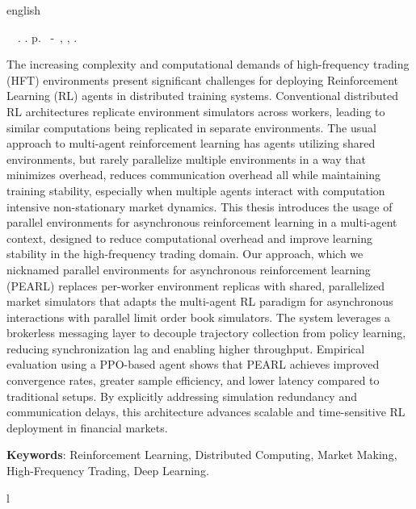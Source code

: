 \begin{resumo}[Abstract]
 \begin{otherlanguage*}{english}
	\begin{flushleft} 
		\setlength{\absparsep}{0pt} %
 		\SingleSpacing  		\imprimirautorabr~~\textbf{\imprimirtitleabstract}.	\imprimirdata.  \pageref{LastPage} p. 
		\imprimirtipotrabalhoabs~-~\imprimirinstituicao, \imprimirlocal, 	\imprimirdata. 
 	\end{flushleft}
	\OnehalfSpacing
    The increasing complexity and computational demands of high-frequency trading (HFT) environments present significant challenges for
    deploying Reinforcement Learning (RL) agents in distributed training systems.
    Conventional distributed RL architectures replicate environment simulators across workers,
    leading to similar computations being replicated in separate environments.
    The usual approach to multi-agent reinforcement learning has agents utilizing shared environments,
    but rarely parallelize multiple environments in a way that minimizes overhead, reduces communication overhead all while maintaining training stability,
    especially when multiple agents interact with computation intensive non-stationary market dynamics.
    This thesis introduces the usage of parallel environments for asynchronous reinforcement learning in a multi-agent context,
    designed to reduce computational overhead and improve learning stability in the high-frequency trading domain.
    Our approach, which we nicknamed parallel environments for asynchronous reinforcement learning (PEARL) replaces per-worker environment replicas with shared,
    parallelized market simulators that adapts the multi-agent RL paradigm for asynchronous interactions with parallel limit order book simulators.
    The system leverages a brokerless messaging layer to decouple trajectory collection from policy learning,
    reducing synchronization lag and enabling higher throughput.
    Empirical evaluation using a PPO-based agent shows that PEARL achieves improved convergence rates, greater sample efficiency,
    and lower latency compared to traditional setups.
    By explicitly addressing simulation redundancy and communication delays,
    this architecture advances scalable and time-sensitive RL deployment in financial markets.

   \vspace{\onelineskip}
 
   \noindent 
   \textbf{Keywords}: Reinforcement Learning, Distributed Computing, Market Making, High-Frequency Trading, Deep Learning.
 \end{otherlanguage*}
\end{resumo}
l